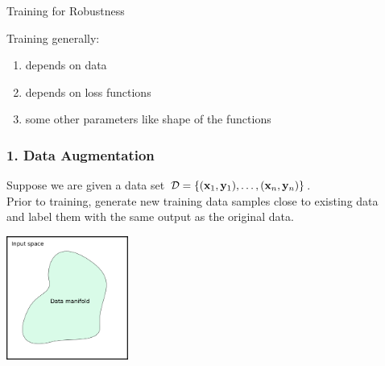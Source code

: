 \documentclass[t,compress,aspectratio=169]{beamer}
\begin{document}
\begin{frame}
  \frametitle{}



  \begin{block}{ Training for Robustness}

    \end{block}


    Training generally:

    \begin{enumerate}
    \item depends on data
    \item depends on loss functions
      \item some other parameters like shape of the functions
      \end{enumerate}

\end{frame}





\begin{frame}[fragile]
  \frametitle{1. Data Augmentation}
  \vspace{-1em}
  Suppose we are given a data set $\mathcal{D} =  \{(\mathbf{x}_1, \mathbf{y}_1), \ldots , (\mathbf{x}_n, \mathbf{y}_n)\}$. \\
  Prior to training, generate new training data samples close to existing data\\ and label them with the same output as the original data.
      {\scriptsize
 \begin{thebibliography}{99}
   \beamertemplatearticlebibitems
\end{thebibliography}}

\pause

\begin{center}

  \includegraphics[width=4cm]{img/SR-vs-CR-1.png}

  \end{center}

\end{frame}
\end{document}
